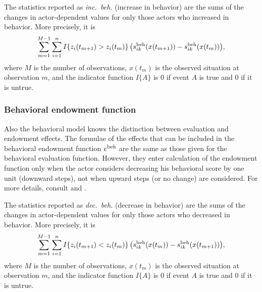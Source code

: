 \documentclass[a4paper,fleqn,11pt]{article}
\newcommand{\+}{\, + \,}
\begin{document}
The statistics reported as \emph{inc.\ beh.} (increase in behavior)
are the sums of the changes in actor-dependent values
for only those actors who increased in behavior.
More precisely, it is
\begin{equation}
\sum_{m=1}^{M-1} \sum_{i=1}^n I\{z_{i}(t_{m+1}) > z_{i}(t_m) \}\,
     \big( s^{\rm beh}_{ik}(x(t_{m+1})) -  s^{\rm beh}_{ik}(x(t_m))   \big) ,
\end{equation}
where $M$ is the number of observations, $x(t_m)$ is the observed situation
at observation $m$, and the indicator function
$I\{A\}$ is 0 if event $A$ is true
and 0 if it is untrue.

\subsubsection{Behavioral endowment function}
Also the behavioral model knows the distinction between evaluation and
endowment effects. The formulae of the effects that can be included
in the behavioral endowment function $e^{\rm beh}$ are the same as
those given for the behavioral evaluation function. However, they enter
calculation of the endowment function only when the actor considers
decreasing his behavioral score by one unit (downward steps), not
when upward steps (or no change) are considered. For more details,
consult
\citet*{SnijdersEA07} and
\citet*{SteglichEA10}.

The statistics reported as \emph{dec.\ beh.} (decrease in behavior)
are the sums of the changes in actor-dependent values
for only those actors who decreased in behavior.
More precisely, it is
\begin{equation}
\sum_{m=1}^{M-1} \sum_{i=1}^n I\{z_{i}(t_{m+1}) < z_{i}(t_m) \}\,
     \big( s^{\rm beh}_{ik}(x(t_{m})) -  s^{\rm beh}_{ik}(x(t_{m+1}))   \big) ,
\end{equation}
where $M$ is the number of observations, $x(t_m)$ is the observed situation
at observation $m$, and the indicator function
$I\{A\}$ is 0 if event $A$ is true
and 0 if it is untrue.
\end{document}
